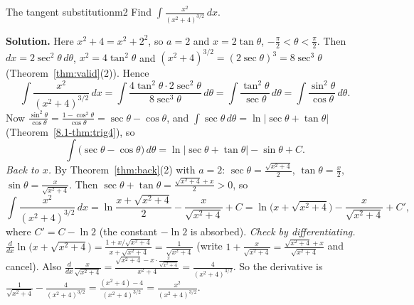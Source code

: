 \documentclass[11pt]{article}
\begin{document}
\begin{exmp}{The tangent substitution}{m2}
Find $\displaystyle\int\frac{x^2}{(x^2+4)^{3/2}}\,dx$.

\textbf{Solution.} Here $x^2+4=x^2+2^2$, so $a=2$ and $x=2\tan\theta$, $-\frac\pi2<\theta<\frac\pi2$. Then $dx=2\sec^2\theta\,d\theta$, $x^2=4\tan^2\theta$ and $(x^2+4)^{3/2}=(2\sec\theta)^3=8\sec^3\theta$ (Theorem~\ref{thm:valid}(2)). Hence
\[\int\frac{x^2}{(x^2+4)^{3/2}}\,dx=\int\frac{4\tan^2\theta\cdot2\sec^2\theta}{8\sec^3\theta}\,d\theta=\int\frac{\tan^2\theta}{\sec\theta}\,d\theta=\int\frac{\sin^2\theta}{\cos\theta}\,d\theta .\]
Now $\frac{\sin^2\theta}{\cos\theta}=\frac{1-\cos^2\theta}{\cos\theta}=\sec\theta-\cos\theta$, and $\int\sec\theta\,d\theta=\ln\lvert\sec\theta+\tan\theta\rvert$ (Theorem~\ref{8.1-thm:trig4}), so
\[\int\big(\sec\theta-\cos\theta\big)\,d\theta=\ln\lvert\sec\theta+\tan\theta\rvert-\sin\theta+C .\]
\emph{Back to $x$.} By Theorem~\ref{thm:back}(2) with $a=2$: $\sec\theta=\frac{\sqrt{x^2+4}}2$, $\tan\theta=\frac x2$, $\sin\theta=\frac x{\sqrt{x^2+4}}$. Then $\sec\theta+\tan\theta=\frac{\sqrt{x^2+4}+x}2>0$, so
\[\int\frac{x^2}{(x^2+4)^{3/2}}\,dx=\ln\frac{x+\sqrt{x^2+4}}2-\frac x{\sqrt{x^2+4}}+C=\ln\big(x+\sqrt{x^2+4}\big)-\frac x{\sqrt{x^2+4}}+C',\]
where $C'=C-\ln2$ (the constant $-\ln 2$ is absorbed).
\emph{Check by differentiating.} $\frac{d}{dx}\ln\big(x+\sqrt{x^2+4}\big)=\frac{1+x/\sqrt{x^2+4}}{x+\sqrt{x^2+4}}=\frac1{\sqrt{x^2+4}}$ (write $1+\frac x{\sqrt{x^2+4}}=\frac{\sqrt{x^2+4}+x}{\sqrt{x^2+4}}$ and cancel). Also $\frac{d}{dx}\frac x{\sqrt{x^2+4}}=\frac{\sqrt{x^2+4}-x\cdot\frac x{\sqrt{x^2+4}}}{x^2+4}=\frac4{(x^2+4)^{3/2}}$. So the derivative is $\frac1{\sqrt{x^2+4}}-\frac4{(x^2+4)^{3/2}}=\frac{(x^2+4)-4}{(x^2+4)^{3/2}}=\frac{x^2}{(x^2+4)^{3/2}}$.
\end{exmp}
\end{document}
